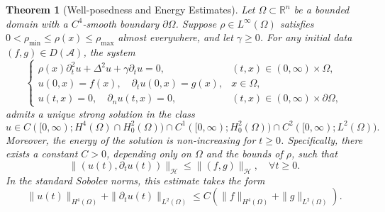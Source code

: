 \documentclass[12pt,reqno]{amsart}
\newtheorem{theo}{Theorem}[section]
\numberwithin{equation}{section}
\begin{document}
	\begin{theo}[Well-posedness and Energy Estimates]\label{th3}
		Let $\Omega \subset \mathbb{R}^n$ be a bounded domain with a $C^4$-smooth boundary $\partial\Omega$. Suppose $\rho \in L^\infty(\Omega)$ satisfies $0 < \rho_{\min} \le \rho(x) \le \rho_{\max}$ almost everywhere, and let $\gamma \ge 0$. For any initial data $(f, g) \in D(\mathcal{A})$, the system
		\begin{equation*}\label{eq:system_wellposed}
			\begin{cases}
				\rho(x)\partial_t^2 u + \Delta^2 u + \gamma\partial_t u = 0, & (t, x) \in (0, \infty) \times \Omega, \\
				u(0, x) = f(x), \quad \partial_t u(0, x) = g(x), & x \in \Omega, \\
				u(t, x) = 0, \quad \partial_n u(t, x) = 0, & (t, x) \in (0, \infty) \times \partial\Omega,
			\end{cases}
		\end{equation*}
		admits a unique strong solution in the class
		\begin{equation*}\label{eq:solution_space}
			u \in C([0, \infty); H^4(\Omega) \cap H_0^2(\Omega)) \cap C^1([0, \infty); H_0^2(\Omega)) \cap C^2([0, \infty); L^2(\Omega)).
		\end{equation*}
		Moreover, the energy of the solution is non-increasing for $t \ge 0$. Specifically, there exists a constant $C > 0$, depending only on $\Omega$ and the bounds of $\rho$, such that
		\begin{equation*}\label{eq:energy_estimate}
			\|(u(t), \partial_t u(t))\|_{\mathcal{H}} \le \|(f, g)\|_{\mathcal{H}}, \quad \forall t \ge 0.
		\end{equation*}
		In the standard Sobolev norms, this estimate takes the form
		\begin{equation*}\label{eq:sobolev_energy}
			\|u(t)\|_{H^4(\Omega)} + \|\partial_t u(t)\|_{L^2(\Omega)} \le C \left( \|f\|_{H^4(\Omega)} + \|g\|_{L^2(\Omega)} \right).
		\end{equation*}
	\end{theo}
	
\end{document}
